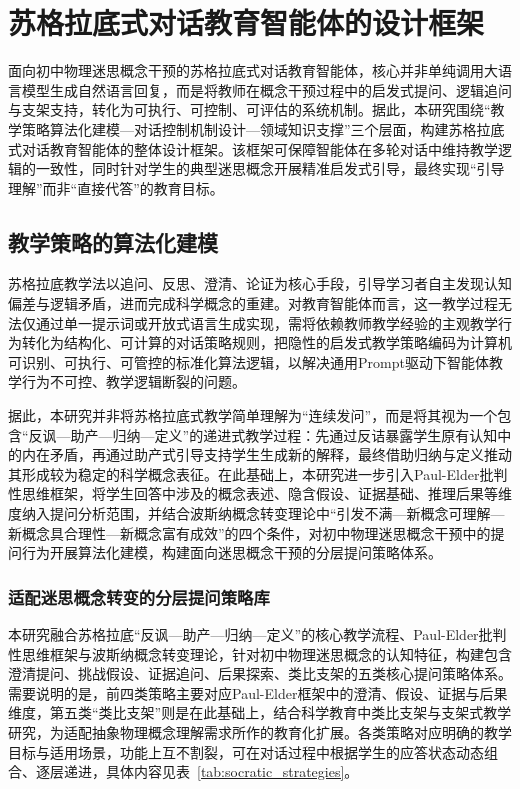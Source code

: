 \chapter{苏格拉底式对话教育智能体的设计框架}
\label{Detailed_Design_Framework}

面向初中物理迷思概念干预的苏格拉底式对话教育智能体，核心并非单纯调用大语言模型生成自然语言回复，而是将教师在概念干预过程中的启发式提问、逻辑追问与支架支持，转化为可执行、可控制、可评估的系统机制。据此，本研究围绕“教学策略算法化建模—对话控制机制设计—领域知识支撑”三个层面，构建苏格拉底式对话教育智能体的整体设计框架。该框架可保障智能体在多轮对话中维持教学逻辑的一致性，同时针对学生的典型迷思概念开展精准启发式引导，最终实现“引导理解”而非“直接代答”的教育目标。


\section{教学策略的算法化建模}

苏格拉底教学法以追问、反思、澄清、论证为核心手段，引导学习者自主发现认知偏差与逻辑矛盾，进而完成科学概念的重建。对教育智能体而言，这一教学过程无法仅通过单一提示词或开放式语言生成实现，需将依赖教师教学经验的主观教学行为转化为结构化、可计算的对话策略规则，把隐性的启发式教学策略编码为计算机可识别、可执行、可管控的标准化算法逻辑，以解决通用Prompt驱动下智能体教学行为不可控、教学逻辑断裂的问题。

据此，本研究并非将苏格拉底式教学简单理解为“连续发问”，而是将其视为一个包含“反讽—助产—归纳—定义”的递进式教学过程：先通过反诘暴露学生原有认知中的内在矛盾，再通过助产式引导支持学生生成新的解释，最终借助归纳与定义推动其形成较为稳定的科学概念表征。在此基础上，本研究进一步引入Paul-Elder批判性思维框架，将学生回答中涉及的概念表述、隐含假设、证据基础、推理后果等维度纳入提问分析范围，并结合波斯纳概念转变理论中“引发不满—新概念可理解—新概念具合理性—新概念富有成效”的四个条件，对初中物理迷思概念干预中的提问行为开展算法化建模，构建面向迷思概念干预的分层提问策略体系。

\subsection{适配迷思概念转变的分层提问策略库}

本研究融合苏格拉底“反讽—助产—归纳—定义”的核心教学流程、Paul-Elder批判性思维框架与波斯纳概念转变理论，针对初中物理迷思概念的认知特征，构建包含澄清提问、挑战假设、证据追问、后果探索、类比支架的五类核心提问策略体系。需要说明的是，前四类策略主要对应Paul-Elder框架中的澄清、假设、证据与后果维度，第五类“类比支架”则是在此基础上，结合科学教育中类比支架与支架式教学研究，为适配抽象物理概念理解需求所作的教育化扩展。各类策略对应明确的教学目标与适用场景，功能上互不割裂，可在对话过程中根据学生的应答状态动态组合、逐层递进，具体内容见表~\ref{tab:socratic_strategies}。

